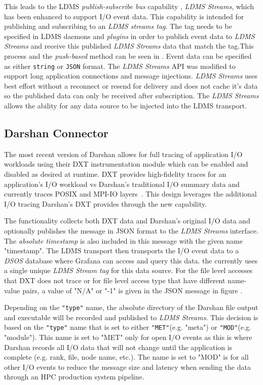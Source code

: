 \documentclass[conference]{IEEEtran}
\begin{document}
This leads to the LDMS \emph{publish-subscribe bus} capability , \emph{LDMS Streams}, which has been enhanced to support I/O event data. This capability is intended for publishing and subscribing to an \emph{LDMS streams tag}. The tag needs to be specified in LDMS daemons and \emph{plugins} in order to publish event data to \emph{LDMS Streams} and receive this published \emph{LDMS Streams} data that match the tag.This process and the \emph{push-based} method can be seen in . Event data can be specified as either \texttt{string} or \texttt{JSON} format. The \emph{LDMS Streams} API was modified to support long application connections and message injections. \emph{LDMS Streams} uses best effort without a reconnect or resend for delivery and does not cache it's data so the published data can only be received after subscription. The \emph{LDMS Streams} allows the ability for any data source to be injected into the LDMS transport.

\subsection{Darshan Connector}

The most recent version of Darshan allows for full tracing of application I/O workloads using their DXT instrumentation module which can be enabled and disabled as desired at runtime. DXT provides high-fidelity traces for an application's I/O workload vs Darshan's traditional I/O summary data and currently traces POSIX and MPI-IO layers~\cite{darshan-runtime}. This design leverages the additional I/O tracing Darshan's DXT provides through the new \connector capability.


The \connector functionality collects both DXT data and Darshan's original I/O data and optionally publishes the message in JSON format to the \emph{LDMS Streams} interface. The \emph{absolute timestamp} is also included in this message with the given name "timestamp". The LDMS transport then transports the I/O event data to a \emph{DSOS} database where Grafana can access and query this data. the \connector currently uses a single unique \emph{LDMS Stream tag} for this data source. For the file level accesses that DXT does not trace or for file level access type that have different name-value pairs, a value of "N/A" or "-1" is given in the JSON message in figure . 

Depending on the \texttt{"type"} name, the absolute directory of the Darshan file output and executable will be recorded and published to \emph{LDMS Streams}. This decision is based on the \texttt{"type"} name that is set to either \texttt{"MET"}(e.g. "meta") or \texttt{"MOD"}(e.g. "module"). This name is set to "MET" only for open I/O events as this is where Darshan records all I/O data that will not change until the application is complete (e.g. rank, file, node name, etc.). The name is set to "MOD" is for all other I/O events to reduce the message size and latency when sending the data through an HPC production system pipeline.
\end{document}
